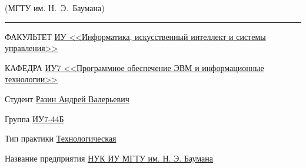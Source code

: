 \documentclass[a4paper,14pt,unknownkeysallowed]{extreport}
\begin{document}
\begin{titlepage}
\begin{center}
{\begin{minipage}{0.80\textwidth}
{                    {(МГТУ им. Н.~Э.~Баумана)}
                }
            \end{minipage}
        }

        \vspace{0.2cm}
        \rule{\linewidth}{3.4pt}

        \begin{flushleft}
            {ФАКУЛЬТЕТ \uline{ИУ <<Информатика, искусственный интеллект и системы управления>> \hfill}}

            \vspace{0.5cm}

            {КАФЕДРА \uline{ИУ7 <<Программное обеспечение ЭВМ и информационные технологии>> \hfill}}
        \end{flushleft}


        {
            \Large{\textbf{}}

            \vspace{0.5cm}
        }

        \vspace{0.5cm}


        \fontsize{14pt}{14pt}\selectfont

        \begin{flushleft}
            {Студент \uline{Разин Андрей Валерьевич \hfill}}

            \vspace{0.5cm}

            {Группа \uline{ИУ7-44Б \hfill}}

            \vspace{0.5cm}

            {Тип практики \uline{Технологическая \hfill}}

            \vspace{0.5cm}

            {Название предприятия \uline{НУК ИУ МГТУ им. Н. Э. Баумана\hfill}}
        \end{flushleft}


\end{center}
\end{titlepage}
\end{document}
